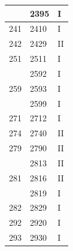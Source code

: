 \documentclass[12pt,a4paper]{article}
\begin{document}
{\begin{longtable}{@{}lll@{}}
		& 2395                                         & I                                 \\ \midrule
		241                                           & 2410                                         & I                                 \\ \midrule
		242                                           & 2429                                         & II                                \\ \midrule
		251                                           & 2511                                         & I                                 \\ \midrule
		\multirow{3}{*}{259}                          & 2592                                         & I                                 \\ \cmidrule(l){2-3} 
		& 2593                                         & I                                 \\ \cmidrule(l){2-3} 
		& 2599                                         & I                                 \\ \midrule
		271                                           & 2712                                         & I                                 \\ \midrule
		274                                           & 2740                                         & II                                \\ \midrule
		279                                           & 2790                                         & II                                \\ \midrule
		\multirow{3}{*}{281}                          & 2813                                         & II                                \\ \cmidrule(l){2-3} 
		& 2816                                         & II                                \\ \cmidrule(l){2-3} 
		& 2819                                         & I                                 \\ \midrule
		282                                           & 2829                                         & I                                 \\ \midrule
		292                                           & 2920                                         & I                                 \\ \midrule
		293                                           & 2930                                         & I                                 \\ \midrule

\end{longtable}}
\end{document}
